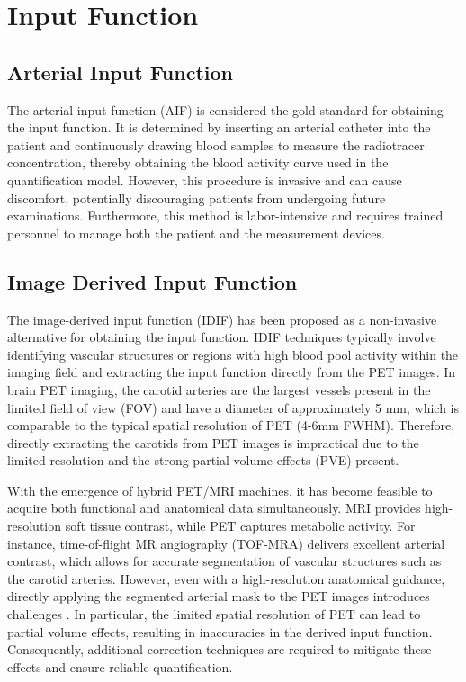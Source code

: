 \section{Input Function}
\subsection{Arterial Input Function}
The arterial input function (AIF) is considered the gold standard for obtaining the input function.
It is determined by inserting an arterial catheter into the patient and continuously drawing blood samples to measure the radiotracer concentration, thereby obtaining the blood activity curve used in the quantification model.
However, this procedure is invasive and can cause discomfort, potentially discouraging patients from undergoing future examinations.
Furthermore, this method is labor-intensive and requires trained personnel to manage both the patient and the measurement devices.

\subsection{Image Derived Input Function}
The image-derived input function (IDIF) has been proposed as a non-invasive alternative for obtaining the input function.
IDIF techniques typically involve identifying vascular structures or regions with high blood pool activity within the imaging field and extracting the input function directly from the PET images.
In brain PET imaging, the carotid arteries are the largest vessels present in the limited field of view (FOV) and have a diameter of approximately 5 mm, which is comparable to the typical spatial resolution of PET (4-6mm FWHM).
Therefore, directly extracting the carotids from PET images is impractical due to the limited resolution and the strong partial volume effects (PVE) present.

With the emergence of hybrid PET/MRI machines, it has become feasible to acquire both functional and anatomical data simultaneously.
MRI provides high-resolution soft tissue contrast, while PET captures metabolic activity.
For instance, time-of-flight MR angiography (TOF-MRA) delivers excellent arterial contrast, which allows for accurate segmentation of vascular structures such as the carotid arteries.
However, even with a high-resolution anatomical guidance, directly applying the segmented arterial mask to the PET images introduces challenges \cite{zanotti2011image}.
In particular, the limited spatial resolution of PET can lead to partial volume effects, resulting in inaccuracies in the derived input function.
Consequently, additional correction techniques are required to mitigate these effects and ensure reliable quantification.

